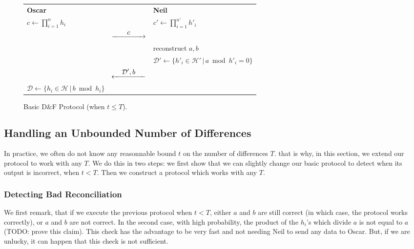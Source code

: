 \documentclass[11pt]{llncs}
\newcommand{\Set}{\mathcal{H}}
\newcommand{\SetD}{\mathcal{D}}
\newcommand{\Rflow}[1]{\stackrel{\displaystyle #1}{\hbox to 5em{\rightarrowfill}}}
\newcommand{\Lflow}[1]{\stackrel{\displaystyle #1}{\hbox to 5em{\leftarrowfill}}}
\begin{document}
\begin{figure}
\centering
\setlength{\tabcolsep}{6pt}
\begin{tabular}{|lcl|}
\hline
\textbf{Oscar}                    &                                        & \textbf{Neil}\\
$c \gets \prod_{i=1}^n h_i$        &                                        & $c' \gets \prod_{i=1}^{n'} h'_i$ \\
                                  & $\Rflow{c}$                            & \\
                                  &                                        & reconstruct  $a,b$ \\
                                  &                                        & $\SetD' \gets \{ h'_i \in \Set' \,|\, a \bmod h'_i = 0 \}$ \\
                                  & $\Lflow{\SetD',b}$                     & \\
$\SetD \gets \{ h_i \in \Set \,|\, b \bmod h_i \}$ & & \\ \hline
\end{tabular}
\caption{Basic D\&F Protocol (when $t \le T$).}\label{fig:basic-df}
\end{figure}

\subsection{Handling an Unbounded Number of Differences}

In practice, we often do not know any reasonnable bound $t$ on the number of differences $T$.
that is why, in this section, we extend our protocol to work with any $T$.
We do this in two steps: we first show that we can slightly change our basic protocol to detect when its output is incorrect, when $t < T$. 
Then we construct a protocol which works with any $T$.

\subsubsection{Detecting Bad Reconciliation}
We first remark, that if we execute the previous protocol when $t < T$, either $a$ and $b$ are still correct (in which case, the protocol works correctly), or $a$ and $b$ are not correct.
In the second case, with high probability, the product of the $h_i$'s which divide $a$ is not equal to $a$ (TODO: prove this claim).
This check has the advantage to be very fast and not needing Neil to send any data to Oscar.
But, if we are unlucky, it can happen that this check is not sufficient.
\end{document}
